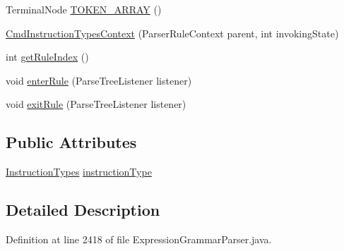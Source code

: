 \begin{DoxyCompactItemize}
\item 
Terminal\+Node \hyperlink{classgov_1_1nasa_1_1jpf_1_1inspector_1_1server_1_1expression_1_1parser_1_1_expression_grammar_pab3186941420d0c466c6d856eeff6b665_a166fe456e6b60b777810e050869432f7}{T\+O\+K\+E\+N\+\_\+\+A\+R\+R\+AY} ()
\item 
\hyperlink{classgov_1_1nasa_1_1jpf_1_1inspector_1_1server_1_1expression_1_1parser_1_1_expression_grammar_pab3186941420d0c466c6d856eeff6b665_a07cef10b7eb1d7b37373318536b13f55}{Cmd\+Instruction\+Types\+Context} (Parser\+Rule\+Context parent, int invoking\+State)
\item 
int \hyperlink{classgov_1_1nasa_1_1jpf_1_1inspector_1_1server_1_1expression_1_1parser_1_1_expression_grammar_pab3186941420d0c466c6d856eeff6b665_a0558ea35b1b6935c085df0667729b5f5}{get\+Rule\+Index} ()
\item 
void \hyperlink{classgov_1_1nasa_1_1jpf_1_1inspector_1_1server_1_1expression_1_1parser_1_1_expression_grammar_pab3186941420d0c466c6d856eeff6b665_a4fa1c0f2b4e30695898f2e3a1e2dc249}{enter\+Rule} (Parse\+Tree\+Listener listener)
\item 
void \hyperlink{classgov_1_1nasa_1_1jpf_1_1inspector_1_1server_1_1expression_1_1parser_1_1_expression_grammar_pab3186941420d0c466c6d856eeff6b665_a230b1aaa18a9f312e4a7f92ef0e790bb}{exit\+Rule} (Parse\+Tree\+Listener listener)
\end{DoxyCompactItemize}
\subsection*{Public Attributes}
\begin{DoxyCompactItemize}
\item 
\hyperlink{enumgov_1_1nasa_1_1jpf_1_1inspector_1_1interfaces_1_1_instruction_types}{Instruction\+Types} \hyperlink{classgov_1_1nasa_1_1jpf_1_1inspector_1_1server_1_1expression_1_1parser_1_1_expression_grammar_pab3186941420d0c466c6d856eeff6b665_a5c492cf329994a1aac620e84cf15390f}{instruction\+Type}
\end{DoxyCompactItemize}


\subsection{Detailed Description}


Definition at line 2418 of file Expression\+Grammar\+Parser.\+java.



